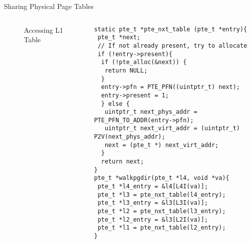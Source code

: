 \documentclass[aspectratio=169,xcolor=dvipsnames]{beamer}
\begin{document}
\begin{frame}[fragile]{Sharing Physical Page Tables}
\begin{columns}[c]
\begin{figure}
\begin{tikzpicture}[x=0.75pt,y=0.75pt,yscale=-0.5,xscale=0.5]
\end{tikzpicture}
        \caption{Accessing L1 Table}
        \label{fig:enter-label}
    \end{figure}
\begin{lstlisting}[style=CStyleNum, basicstyle=\tiny]
static pte_t *pte_nxt_table (pte_t *entry){
 pte_t *next;
 // If not already present, try to allocate
 if (!entry->present){
  if (!pte_alloc(&next)) {
   return NULL;
  }
  entry->pfn = PTE_PFN((uintptr_t) next);
  entry->present = 1;
  } else {
   uintptr_t next_phys_addr = PTE_PFN_TO_ADDR(entry->pfn);        
   uintptr_t next_virt_addr = (uintptr_t) P2V(next_phys_addr);
   next = (pte_t *) next_virt_addr;
  }
  return next;
}   
pte_t *walkpgdir(pte_t *l4, void *va){ 
 pte_t *l4_entry = &l4[L4I(va)];
 pte_t *l3 = pte_nxt_table(l4_entry);
 pte_t *l3_entry = &l3[L3I(va)];
 pte_t *l2 = pte_nxt_table(l3_entry);
 pte_t *l2_entry = &l3[L2I(va)];  
 pte_t *l1 = pte_nxt_table(l2_entry);
}

\end{lstlisting}
\end{columns}
\end{frame}
\end{document}
